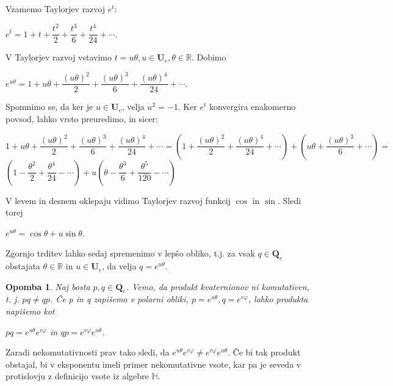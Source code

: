\documentclass[a4paper,12pt]{article}
\def\R{\mathbb{R}} %
\def\H{\mathbb{H}} %
\def\Qe{\textbf{Q}_{e}} %
\def\Ue{\textbf{U}_{e}} %
\newtheorem{opomba}{Opomba}
\begin{document}
Vzamemo Taylorjev razvoj $e^t$:
\begin{center}
   $e^t = 1+t+\dfrac{t^2}{2}+\dfrac{t^3}{6}+\dfrac{t^4}{24} + \cdots$.
\end{center}
V Taylorjev razvoj vstavimo $t = u\theta, u \in \Ue, \theta \in \R$. Dobimo %
\begin{center}
   $e^{u\theta} = 1 + u\theta + \dfrac{(u\theta)^2}{2} + \dfrac{(u\theta)^3}{6} + \dfrac{(u\theta)^4}{24} + \cdots$.
\end{center}
Spomnimo se, da ker je $u \in \Ue$, velja $u^2=-1$. Ker $e^t$ konvergira enakomerno povsod, lahko vrsto preuredimo, in sicer:
\begin{center}
   $1 + u\theta + \dfrac{(u\theta)^2}{2} + \dfrac{(u\theta)^3}{6} + \dfrac{(u\theta)^4}{24} + \cdots = (1 + \dfrac{(u\theta)^2}{2} + \dfrac{(u\theta)^4}{24}+ \cdots) + (u\theta + \dfrac{(u\theta)^3}{6} + \cdots) = $
   $(1-\dfrac{\theta^2}{2}+\dfrac{\theta^4}{24}- \cdots) + u(\theta - \dfrac{\theta^3}{6} +\dfrac{\theta^5}{120} - \cdots)$
\end{center}
V levem in desnem oklepaju vidimo Taylorjev razvoj funkcij $\cos$ in $\sin$. Sledi torej
\begin{center}
   $e^{u\theta} = \cos\theta  + u\sin\theta$.
\end{center}
Zgornjo trditev lahko sedaj spremenimo v lepšo obliko, t.j. za vsak $q \in \Qe$ obstajata
$\theta \in \R$ in $u \in \Ue$, da velja $q =  e^{u\theta}$.

\begin{opomba} 
Naj bosta $p,q \in \Qe$. Vemo, da produkt kvaternionov ni komutativen, t. j. $p q \neq q p$. Če p in q zapišemo v polarni obliki, 
$p = e^{u\theta}, q = e^{v\varphi}$, lahko produkta napišemo kot
\begin{center}
   $p q = e^{u\theta} e^{v\varphi}$ in $q p = e^{v\varphi}e^{u\theta}$.
\end{center}
\end{opomba}
Zaradi nekomutativnosti prav tako sledi, da $e^{u\theta} e^{v\varphi} \neq e^{v\varphi}e^{u\theta}$. Če bi tak produkt obstajal, bi v eksponentu imeli primer nekomutativne vsote,
kar pa je seveda v protislovju z definicijo vsote iz algebre $\H$.
\end{document}
